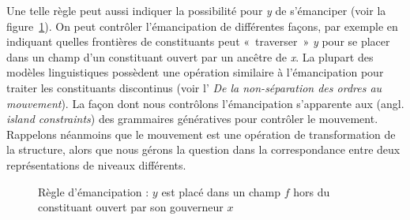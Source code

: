     Une telle règle peut aussi indiquer la possibilité pour \textit{y} de s’émanciper (voir la figure~\ref{fig:regle-emancipation}). On peut contrôler l’émancipation de différentes façons, par exemple en indiquant quelles frontières de constituants peut «~traverser~» \textit{y} pour se placer dans un champ d’un constituant ouvert par un ancêtre de \textit{x}. La plupart des modèles linguistiques possèdent une opération similaire à l’émancipation pour traiter les constituants discontinus (voir l'  \textit{De la non-séparation des ordres au mouvement}). La façon dont nous contrôlons l’émancipation s’apparente aux  (angl. \textit{island constraints}) des grammaires génératives pour contrôler le mouvement. Rappelons néanmoins que le mouvement est une opération de transformation de la structure, alors que nous gérons la question dans la correspondance entre deux représentations de niveaux différents.
  
    
    \begin{figure}[H]
    \caption{Règle d'émancipation : $y$ est placé dans un champ $f$ hors du constituant ouvert par son gouverneur $x$}
    \label{fig:regle-emancipation}
    \end{figure}

